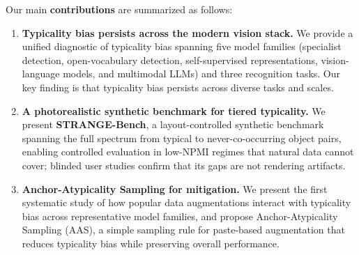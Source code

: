 Our main \textbf{contributions} are summarized as follows:

\begin{enumerate}[leftmargin=*,nosep]
\item \textbf{Typicality bias persists across the modern vision stack.} We provide a unified diagnostic of typicality bias spanning five model families (specialist detection, open-vocabulary detection, self-supervised representations, vision-language models, and multimodal LLMs) and three recognition tasks. Our key finding is that typicality bias persists across diverse tasks and scales.

\item \textbf{A photorealistic synthetic benchmark for tiered typicality.} We present \textbf{STRANGE-Bench}, a layout-controlled synthetic benchmark spanning the full spectrum from typical to never-co-occurring object pairs, enabling controlled evaluation in low-NPMI regimes that natural data cannot cover; blinded user studies confirm that its gaps are not rendering artifacts.

\item \textbf{Anchor-Atypicality Sampling for mitigation.} We present the first systematic study of how popular data augmentations interact with typicality bias across representative model families, and propose Anchor-Atypicality Sampling (AAS), a simple sampling rule for paste-based augmentation that reduces typicality bias while preserving overall performance.
\end{enumerate}
